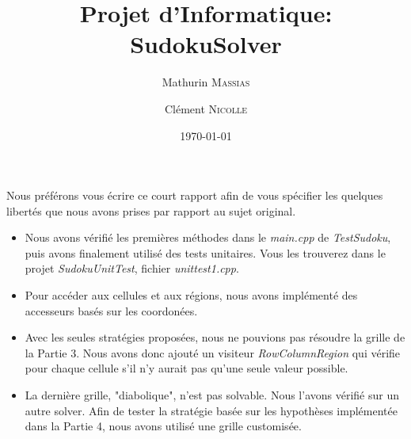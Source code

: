 \documentclass[11pt,a4paper]{article}
\title{Projet d'Informatique: SudokuSolver}
\author{Mathurin \textsc{Massias} \and Clément \textsc{Nicolle}}
\date{\today}
\begin{document}
	
\maketitle

Nous préférons vous écrire ce court rapport afin de vous spécifier les quelques libertés que nous avons prises par rapport au sujet original.
\\
\begin{itemize}
	\item Nous avons vérifié les premières méthodes dans le \textit{main.cpp} de \textit{TestSudoku}, puis avons finalement utilisé des tests unitaires. Vous les trouverez dans le projet \textit{SudokuUnitTest}, fichier \textit{unittest1.cpp}.
	\\
	\item Pour accéder aux cellules et aux régions, nous avons implémenté des accesseurs basés sur les coordonées.
	\\
	\item Avec les seules stratégies proposées, nous ne pouvions pas résoudre la grille de la Partie 3. Nous avons donc ajouté un visiteur \textit{RowColumnRegion} qui vérifie pour chaque cellule s'il n'y aurait pas qu'une seule valeur possible.
	\\
	\item La dernière grille, "diabolique", n'est pas solvable. Nous l'avons vérifié sur un autre solver. Afin de tester la stratégie basée sur les hypothèses implémentée dans la Partie 4, nous avons utilisé une grille customisée.
\end{itemize}
\end{document}
